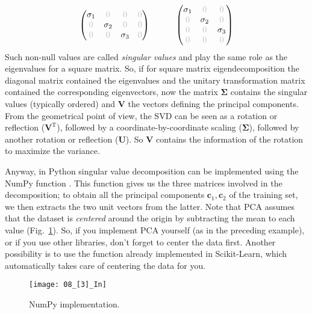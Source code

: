 \begin{equation}
\begin{pmatrix}
\sigma_1 & \color{gray!50}0 & \color{gray!50}0 & \color{gray!50}0 \\
\color{gray!50}0 & \sigma_2 & \color{gray!50}0 & \color{gray!50}0 \\
\color{gray!50}0 & \color{gray!50}0 & \sigma_3 & \color{gray!50}0
\end{pmatrix}\qquad\quad
\begin{pmatrix}
\sigma_1 & \color{gray!50}0 & \color{gray!50}0 \\
\color{gray!50}0 & \sigma_2 & \color{gray!50}0 \\
\color{gray!50}0 & \color{gray!50}0 & \sigma_3 \\
\color{gray!50}0 & \color{gray!50}0 & \color{gray!50}0
\end{pmatrix}
\end{equation}
Such non-null values are called \emph{singular values} and play the same role as the eigenvalues for a square matrix. So, if for square matrix eigendecomposition the diagonal matrix contained the eigenvalues and the unitary transformation matrix contained the corresponding eigenvectors, now the matrix $\boldsymbol{\Sigma}$ contains the singular values (typically ordered) and $\mathbf{V}$ the vectors defining the principal components. From the geometrical point of view, the SVD can be seen as a rotation or reflection ($\mathbf{V}^{\mathrm{T}}$), followed by a coordinate-by-coordinate scaling ($\boldsymbol{\Sigma}$), followed by another rotation or reflection ($\mathbf{U}$). So $\mathbf{V}$ contains the information of the rotation to maximize the variance.

Anyway, in Python singular value decomposition can be implemented using the NumPy function . This function gives us the three matrices involved in the decomposition; to obtain all the principal components $\mathbf{c}_1,\mathbf{c}_2$ of the training set, we then extracts the two unit vectors from the latter. Note that PCA assumes that the dataset is \emph{centered} around the origin by subtracting the mean to each value (Fig.~\ref{08_[3]_In}). So, if you implement PCA yourself (as in the preceding example), or if you use other libraries, don't forget to center the data first. Another possibility is to use the  function already implemented in Scikit-Learn, which automatically takes care of centering the data for you.
\begin{figure}[h!t]
\centering
\texttt{[image: 08\_[3]\_In]}
\caption{NumPy implementation.}\label{08_[3]_In}
\end{figure}

